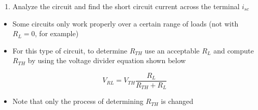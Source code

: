 \begin{itemize}
\begin{enumerate}
      \item Analyze the circuit and find the short circuit current across the terminal $i_{sc}$

    \end{enumerate}

    \begin{itemize}

      \item Some circuits only work properly over a certain range of loads (not with $R_L=0$, for example)

      \item For this type of circuit, to determine $R_{TH}$ use an acceptable $R_L$ and compute $R_{TH}$ by using the voltage divider equation shown below

        $$V_{RL}=V_{TH}\frac{R_L}{R_{TH}+R_L}$$

      \item Note that only the process of determining $R_{TH}$ is changed

    \end{itemize}

\end{itemize}



